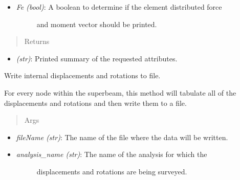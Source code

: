 \documentclass[letterpaper,10pt,english]{sphinxmanual}
\begin{document}
\begin{fulllineitems}
\begin{fulllineitems}
\begin{itemize}
\begin{description}
\end{description}

\item {} \begin{description}
\item[{\emph{Fe (bool)}: A boolean to determine if the element distributed force}] \leavevmode
and moment vector should be printed.

\end{description}

\end{itemize}
\begin{quote}\begin{description}
\item[{Returns}] \leavevmode
\end{description}\end{quote}
\begin{itemize}
\item {} 
\emph{(str)}: Printed summary of the requested attributes.

\end{itemize}

\end{fulllineitems}


\begin{fulllineitems}
\label{structures:AeroComBAT.Structures.SuperBeam.writeDisplacements}
Write internal displacements and rotations to file.

For every node within the superbeam, this method will tabulate all of
the displacements and rotations and then write them to a file.
\begin{quote}\begin{description}
\item[{Args}] \leavevmode
\end{description}\end{quote}
\begin{itemize}
\item {} 
\emph{fileName (str)}: The name of the file where the data will be written.

\item {} \begin{description}
\item[{\emph{analysis\_name (str)}: The name of the analysis for which the}] \leavevmode
displacements and rotations are being surveyed.


\end{description}
\end{itemize}
\end{fulllineitems}
\end{fulllineitems}
\end{document}
